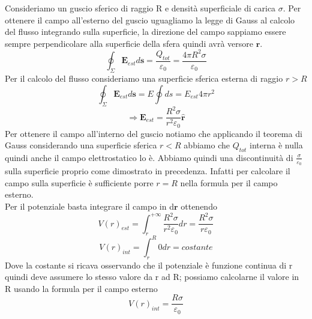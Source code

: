 \documentclass[
10pt, %
a4paper, %
oneside, %
headinclude,footinclude, %
BCOR5mm, %
]{scrartcl}
\begin{document}
\begin{esercizio}
Consideriamo un guscio sferico di raggio R e densità superficiale di carica $\sigma$. Per ottenere il campo all'esterno del guscio uguagliamo la legge di Gauss al calcolo del flusso integrando sulla superficie, la direzione del campo sappiamo essere sempre perpendicolare alla superficie della sfera quindi avrà versore $\hat{\mathbf{r}}$.
\[\oint_{\Sigma}\mathbf{E}_{est}d\mathbf{s} = \frac{Q_{tot}}{\varepsilon_0} = \frac{4\pi R^2 \sigma}{\varepsilon_0}\]
Per il calcolo del flusso consideriamo una superficie sferica esterna di raggio \(r>R\)
\[\oint_{\Sigma}\mathbf{E}_{est}d\mathbf{s} = E\oint ds = E_{est} 4\pi r^2\]
\[\Rightarrow \mathbf{E}_{est} = \frac{R^2 \sigma}{r^2 \varepsilon_0} \hat{\mathbf{r}}\]
Per ottenere il campo all'interno del guscio notiamo che applicando il teorema di Gauss considerando una superficie sferica \(r<R\) abbiamo che \(Q_{tot}\) interna è nulla quindi anche il campo elettrostatico lo è. Abbiamo quindi una discontinuità di $\frac{\sigma}{\varepsilon_0}$ sulla superficie proprio come dimostrato in precedenza. Infatti per calcolare il campo sulla superficie è sufficiente porre \(r=R\) nella formula per il campo esterno.\\
Per il potenziale basta integrare il campo in d$\mathbf{r}$ ottenendo
\[V(r)_{est} = \int_{r}^{+\infty} \frac{R^2 \sigma}{r^2 \varepsilon_0} dr = \frac{R^2 \sigma}{ r\varepsilon_0}\]
\[V(r)_{int} = \int^{R}_r 0 dr = costante \]
Dove la costante si ricava osservando che il potenziale è funzione continua di r quindi deve assumere lo stesso valore da r ad R; possiamo calcolarne il valore in R usando la formula per il campo esterno
\[V(r)_{int} = \frac{R \sigma}{\varepsilon_0}\]
\end{esercizio}
\end{document}
